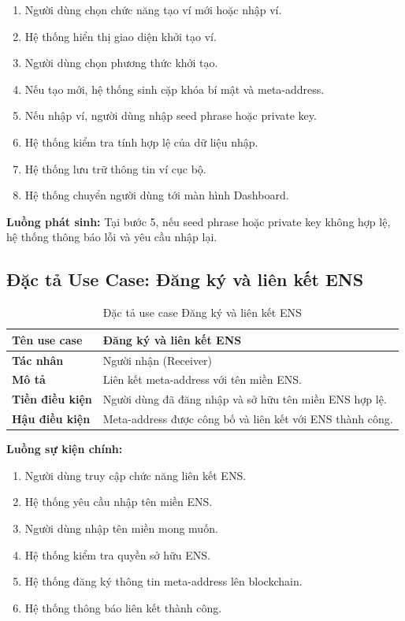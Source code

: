 \documentclass[../DoAn.tex]{subfiles}
\begin{document}
\begin{enumerate}
    \item Người dùng chọn chức năng tạo ví mới hoặc nhập ví.
    \item Hệ thống hiển thị giao diện khởi tạo ví.
    \item Người dùng chọn phương thức khởi tạo.
    \item Nếu tạo mới, hệ thống sinh cặp khóa bí mật và meta-address.
    \item Nếu nhập ví, người dùng nhập seed phrase hoặc private key.
    \item Hệ thống kiểm tra tính hợp lệ của dữ liệu nhập.
    \item Hệ thống lưu trữ thông tin ví cục bộ.
    \item Hệ thống chuyển người dùng tới màn hình Dashboard.
\end{enumerate}

\textbf{Luồng phát sinh:} Tại bước 5, nếu seed phrase hoặc private key không hợp lệ, hệ thống thông báo lỗi và yêu cầu nhập lại.


\subsection{Đặc tả Use Case: Đăng ký và liên kết ENS}

\begin{table}[H]
\centering
\caption{Đặc tả use case Đăng ký và liên kết ENS}
\begin{tabular}{|p{4cm}|p{10cm}|}
\hline
\textbf{Tên use case} & Đăng ký và liên kết ENS \\ \hline
\textbf{Tác nhân} & Người nhận (Receiver) \\ \hline
\textbf{Mô tả} & Liên kết meta-address với tên miền ENS. \\ \hline
\textbf{Tiền điều kiện} & Người dùng đã đăng nhập và sở hữu tên miền ENS hợp lệ. \\ \hline
\textbf{Hậu điều kiện} & Meta-address được công bố và liên kết với ENS thành công. \\ \hline
\end{tabular}
\end{table}

\textbf{Luồng sự kiện chính:}

\begin{enumerate}
    \item Người dùng truy cập chức năng liên kết ENS.
    \item Hệ thống yêu cầu nhập tên miền ENS.
    \item Người dùng nhập tên miền mong muốn.
    \item Hệ thống kiểm tra quyền sở hữu ENS.
    \item Hệ thống đăng ký thông tin meta-address lên blockchain.
    \item Hệ thống thông báo liên kết thành công.
\end{enumerate}
\end{document}
